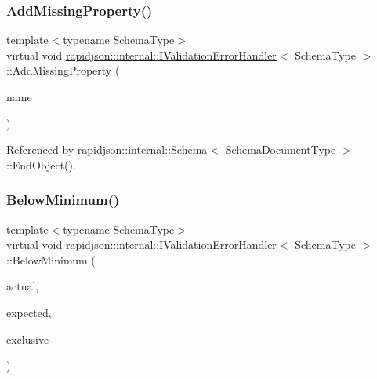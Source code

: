 \subsubsection{\texorpdfstring{AddMissingProperty()}{AddMissingProperty()}}
{\footnotesize\ttfamily template$<$typename Schema\+Type$>$ \\
virtual void \mbox{\hyperlink{classrapidjson_1_1internal_1_1_i_validation_error_handler}{rapidjson\+::internal\+::\+I\+Validation\+Error\+Handler}}$<$ Schema\+Type $>$\+::Add\+Missing\+Property (\begin{DoxyParamCaption}\item[{const \mbox{\hyperlink{classrapidjson_1_1internal_1_1_i_validation_error_handler_a8a2aaf7eb28a3ce7ed81689141f3af1f}{S\+Value}} \&}]{name }\end{DoxyParamCaption})\hspace{0.3cm}{\ttfamily [pure virtual]}}



Referenced by rapidjson\+::internal\+::\+Schema$<$ Schema\+Document\+Type $>$\+::\+End\+Object().

\mbox{\label{classrapidjson_1_1internal_1_1_i_validation_error_handler_a8f2ab1e22a22bcf693d40c3c8ad39c75}} 
\subsubsection{\texorpdfstring{BelowMinimum()}{BelowMinimum()}\hspace{0.1cm}{\footnotesize\ttfamily [1/3]}}
{\footnotesize\ttfamily template$<$typename Schema\+Type$>$ \\
virtual void \mbox{\hyperlink{classrapidjson_1_1internal_1_1_i_validation_error_handler}{rapidjson\+::internal\+::\+I\+Validation\+Error\+Handler}}$<$ Schema\+Type $>$\+::Below\+Minimum (\begin{DoxyParamCaption}\item[{\mbox{\hyperlink{stdint_8h_a414156feea104f8f75b4ed9e3121b2f6}{int64\+\_\+t}}}]{actual,  }\item[{const \mbox{\hyperlink{classrapidjson_1_1internal_1_1_i_validation_error_handler_a8a2aaf7eb28a3ce7ed81689141f3af1f}{S\+Value}} \&}]{expected,  }\item[{bool}]{exclusive }\end{DoxyParamCaption})\hspace{0.3cm}{\ttfamily [pure virtual]}}



